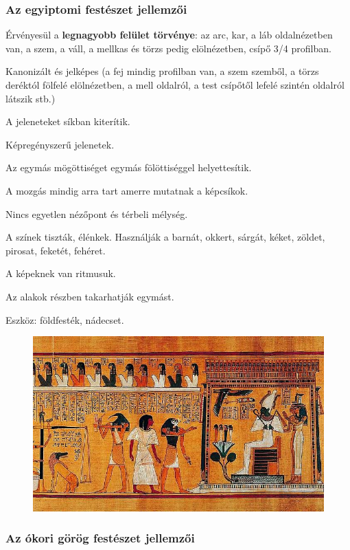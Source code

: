 	\subsubsection{Az egyiptomi festészet jellemzői}
	\begin{compactitem}
		\item Érvényesül a \textbf{legnagyobb felület törvénye}: az arc,  kar, a láb oldalnézetben van, a szem, a váll, a mellkas és törzs pedig elölnézetben, csípő 3/4 profilban.
		\item Kanonizált és jelképes (a fej mindig profilban van, a szem szemből, a törzs deréktól
		fölfelé elölnézetben, a mell oldalról, a test csípőtől lefelé szintén oldalról látszik stb.)
		\item A jeleneteket síkban kiterítik.
		\item Képregényszerű jelenetek.
		\item Az egymás mögöttiséget egymás fölöttiséggel helyettesítik.
		\item A mozgás mindig arra tart amerre mutatnak a képcsíkok.
		\item Nincs egyetlen nézőpont és térbeli mélység.
		\item A színek tiszták, élénkek. Használják a barnát, okkert, sárgát, kéket, zöldet, pirosat,
		feketét, fehéret.
		\item A képeknek van ritmusuk.
		\item Az alakok részben takarhatják egymást.
		\item Eszköz: földfesték, nádecset.
	\end{compactitem}

	\begin{figure}[H]
		\centering
		\includegraphics[width=0.8\linewidth]{egyiptom}
	\end{figure}
	
	
	\subsubsection{Az ókori görög festészet jellemzői}
	
